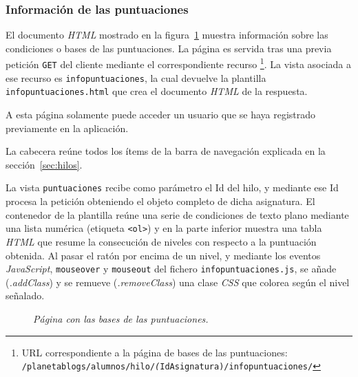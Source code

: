 \documentclass[a4paper, 12pt]{book}
\begin{document}
\subsubsection{Informaci\'on de las puntuaciones} 
\label{sec:informacionpuntuaciones}
El documento \textit{HTML} mostrado en la figura~\ref{fig:informacionpuntuaciones} muestra informaci\'on sobre las condiciones o bases de las puntuaciones. 
La p\'agina es servida tras una previa petici\'on \texttt{GET} del cliente mediante el correspondiente recurso \footnote{URL correspondiente a la p\'agina de 
bases de las puntuaciones:\\ \texttt{/planetablogs/alumnos/hilo/\textit(IdAsignatura)/infopuntuaciones/}}. La vista asociada a ese recurso es 
\texttt{infopuntuaciones}, la cual devuelve la plantilla \texttt{infopuntuaciones.html} que crea el documento \textit{HTML} de la respuesta.

A esta p\'agina solamente puede acceder un usuario que se haya registrado previamente en la aplicaci\'on.

La cabecera re\'une todos los \'items de la barra de navegaci\'on explicada en la secci\'on~\ref{sec:hilos}.

La vista \texttt{puntuaciones} recibe como par\'ametro el Id del hilo, y mediante ese Id procesa la petici\'on obteniendo el objeto completo de dicha 
asignatura. El contenedor de la plantilla re\'une una serie de condiciones de texto plano mediante una lista num\'erica (etiqueta \texttt{<ol>}) y 
en la parte inferior muestra una tabla \textit{HTML} que resume la consecuci\'on de niveles con respecto a la puntuaci\'on obtenida. Al pasar el rat\'on por encima 
de un nivel, y mediante los eventos \textit{JavaScript}, \texttt{mouseover} y \texttt{mouseout} del fichero \texttt{infopuntuaciones.js}, se a\~nade 
(\textit{.addClass}) y se remueve (\textit{.removeClass}) una clase \textit{CSS} que colorea seg\'un el nivel se\~nalado.

\begin{figure}
  \centering
  \caption{\textit{P\'agina con las bases de las puntuaciones.}}
  \label{fig:informacionpuntuaciones}
\end{figure}
\end{document}
